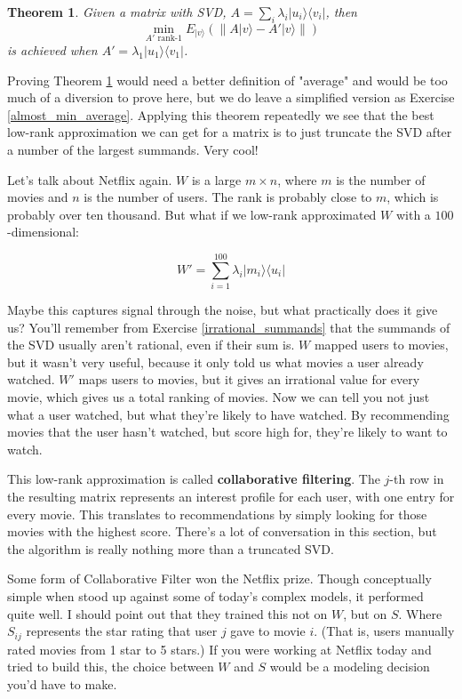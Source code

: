 \documentclass{amsbook}
\newtheorem{theorem}{Theorem}
\begin{document}
\begin{theorem}
\label{min_average}
Given a matrix with SVD, $A=\sum_i\lambda_i|u_i\rangle\langle v_i|$, then 
$$
\min_{A'\text{ rank-$1$}}E_{|v\rangle}\left(\left\|A|v\rangle-A'|v\rangle\right\|\right)
$$
is achieved when $A'=\lambda_1|u_1\rangle\langle v_1|$.
\end{theorem}

Proving Theorem \ref{min_average} would need a better definition of "average" and would be too much of a diversion to prove here, but we do leave a simplified version as Exercise \ref{almost_min_average}.  Applying this theorem repeatedly we see that the best low-rank approximation we can get for a matrix is to just truncate the SVD after a number of the largest summands.  Very cool!

Let's talk about Netflix again.  $W$ is a large $m\times n$, where $m$ is the number of movies and $n$ is the number of users.  The rank is probably close to $m$, which is probably over ten thousand.  But what if we low-rank approximated $W$ with a $100$-dimensional:

$$
W'=\sum_{i=1}^{100}\lambda_i|m_i\rangle\langle u_i|
$$

Maybe this captures signal through the noise, but what practically does it give us?  You'll remember from Exercise \ref{irrational_summands} that the summands of the SVD usually aren't rational, even if their sum is.  $W$ mapped users to movies, but it wasn't very useful, because it only told us what movies a user already watched.  $W'$ maps users to movies, but it gives an irrational value for every movie, which gives us a total ranking of movies.  Now we can tell you not just what a user watched, but what they're likely to have watched.  By recommending movies that the user hasn't watched, but score high for, they're likely to want to watch.

This low-rank approximation is called {\bf collaborative filtering}.  The $j$-th row in the resulting matrix represents an interest profile for each user, with one entry for every movie.  This translates to recommendations by simply looking for those movies with the highest score.  There's a lot of conversation in this section, but the algorithm is really nothing more than a truncated SVD.

Some form of Collaborative Filter won the Netflix prize.  Though conceptually simple when stood up against some of today's complex models, it performed quite well.  I should point out that they trained this not on $W$, but on $S$.  Where $S_{ij}$ represents the star rating that user $j$ gave to movie $i$.  (That is, users manually rated movies from 1 star to 5 stars.)  If you were working at Netflix today and tried to build this, the choice between $W$ and $S$ would be a modeling decision you'd have to make.
\end{document}
